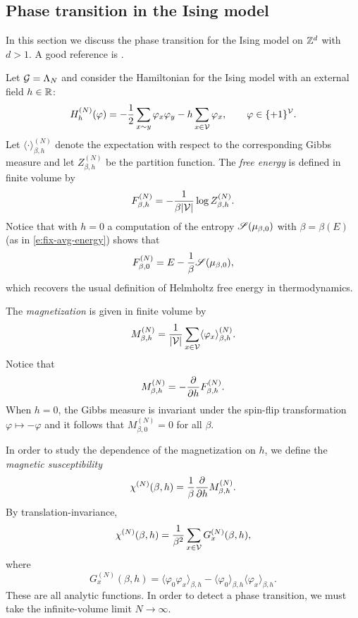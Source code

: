 
\subsection{Phase transition in the Ising model}

In this section we discuss the phase transition for the Ising model on ${ {{\mathbb Z}}^d }$
with $d > 1$. A good reference is \cite{FV17}.

Let $\mathcal{G} = \Lambda_N$ and consider the Hamiltonian for the Ising model with
an external field $h\in{\mathbb R}$:
\begin{equation}
H^{(N)}_h(\varphi)
	=
-\frac12 \sum_{x \sim y} \varphi_x \varphi_y
- h \sum_{x\in\mathcal{V}} \varphi_x,
	\qquad
\varphi\in\{+1\}^{\mathcal{V}}.
\end{equation}
Let $\langle\cdot\rangle^{(N)}_{\beta,h}$ denote the expectation with respect to
the corresponding Gibbs measure and let $Z^{(N)}_{\beta,h}$ be the partition function.
The \emph{free energy} is defined in finite volume by
\begin{equation}
F^{(N)}_{\beta,h}
	=
-\frac{1}{\beta |\mathcal{V}|} \log Z^{(N)}_{\beta,h}.
\end{equation}
Notice that with $h = 0$ a computation of the entropy $\mathscr{S}(\mu_{\beta,0})$
with $\beta = \beta(E)$ (as in \eqref{e:fix-avg-energy}) shows that
\begin{equation}
F^{(N)}_{\beta,0} = E - \frac{1}{\beta} \mathscr{S}(\mu_{\beta,0}),
\end{equation}
which recovers the usual definition of Helmholtz free energy in thermodynamics.

The \emph{magnetization} is given in finite volume by
\begin{equation}
M^{(N)}_{\beta,h}
	=
\frac{1}{|\mathcal{V}|} \sum_{x\in \mathcal{V}} \langle \varphi_x \rangle^{(N)}_{\beta,h}.
\end{equation}
Notice that
\begin{equation}
M^{(N)}_{\beta,h}
	=
-\frac{\partial }{\partial h} F^{(N)}_{\beta,h}.
\end{equation}
When $h = 0$, the Gibbs measure is invariant under the spin-flip transformation
$\varphi \mapsto -\varphi$ and it follows that $M^{(N)}_{\beta,0} = 0$ for all $\beta$.

In order to study the dependence of the magnetization on $h$, we define the
\emph{magnetic susceptibility}
\begin{equation}
\chi^{(N)}(\beta, h)
	=
\frac{1}{\beta} \frac{\partial }{\partial h} M^{(N)}_{\beta,h}.
\end{equation}
By translation-invariance,
\begin{equation}
\label{e:Ising-suscept}
\chi^{(N)}(\beta, h)
	=
\frac{1}{\beta^2}
\sum_{x\in\mathcal{V}} G^{(N)}_x(\beta, h),
\end{equation}
where
\begin{equation}
\label{e:Ising-2pt}
G^{(N)}_x(\beta, h)
	=
\langle \varphi_0 \varphi_x \rangle_{\beta,h}
	-
\langle\varphi_0\rangle_{\beta,h} \langle\varphi_x\rangle_{\beta,h}.
\end{equation}
These are all analytic functions.
In order to detect a phase transition, we must take the infinite-volume limit $N\to\infty$.

